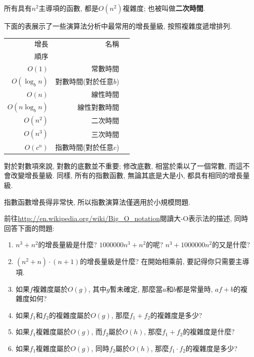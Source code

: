 \documentclass[10pt]{book}
\begin{document}
所有具有$n^2$主導項的函數, 都是$O(n^2)$複雜度; 也被叫做{\bf 二次時間}. 

下面的表展示了一些演算法分析中最常用的增長量級, 
按照複雜度遞增排列. 

\begin{tabular}{|r|r|r|}
\hline
增長     &   名稱      \\
順序      &               \\
\hline
$O(1)$             & 常數時間 \\
$O(\log_b n)$      & 對數時間(對於任意$b$) \\
$O(n)$             & 線性時間 \\
$O(n \log_b n)$    & 線性對數時間 \\
$O(n^2)$           & 二次時間   \\
$O(n^3)$           & 三次時間   \\
$O(c^n)$           & 指數時間(對於任意$c$)  \\
\hline
\end{tabular}

對於對數項來說, 對數的底數並不重要;
修改底數, 相當於乘以了一個常數, 
而這不會改變增長量級. 
同樣, 所有的指數函數, 無論其底是大是小, 都具有相同的增長量級. 

指數函數增長得非常快, 所以指數演算法僅適用於小規模問題. 


\begin{exercise}
前往\url{http://en.wikipedia.org/wiki/Big_O_notation}閱讀大-O表示法的描述, 
同時回答下面的問題:

\begin{enumerate}
\item $n^3 + n^2$的增長量級是什麼? $1000000 n^3 + n^2$的呢?
$n^3 + 1000000 n^2$的又是什麼?

\item $(n^2 + n) \cdot (n + 1)$的增長量級是什麼? 在開始相乘前, 要記得你只需要主導項. 

\item 如果$f$複雜度屬於$O(g)$, 其中$g$暫未確定, 那麼當$a$和$b$都是常量時, 
$af+b$的複雜度如何?

\item 如果$f_1$和$f_2$的複雜度屬於$O(g)$, 那麼$f_1 + f_2$的複雜度是多少?

\item 如果$f_1$複雜度屬於$O(g)$, 而$f_2$屬於$O(h)$, 那麼$f_1 + f_2$的複雜度是什麼?

\item 如果$f_1$複雜度屬於$O(g)$, 同時$f_2$屬於$O(h)$, 那麼$f_1 \cdot f_2$的複雜度是多少?
\end{enumerate}

\end{exercise}
\end{document}

